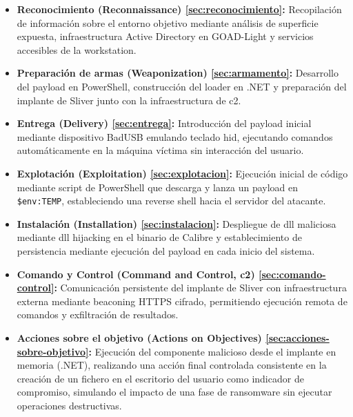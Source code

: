 \begin{itemize}
    \item \textbf{Reconocimiento (Reconnaissance) \ref{sec:reconocimiento}:} 
    Recopilación de información sobre el entorno objetivo mediante análisis de superficie expuesta, infraestructura Active Directory en GOAD-Light y servicios accesibles de la workstation.
     
    \item \textbf{Preparación de armas (Weaponization) \ref{sec:armamento}:} 
    Desarrollo del payload en PowerShell, construcción del loader en .NET y preparación del implante de Sliver junto con la infraestructura de \acrshort{c2}.
 
    \item \textbf{Entrega (Delivery) \ref{sec:entrega}:} 
    Introducción del payload inicial mediante dispositivo BadUSB emulando teclado \acrshort{hid}, ejecutando comandos automáticamente en la máquina víctima sin interacción del usuario.

    \item \textbf{Explotación (Exploitation) \ref{sec:explotacion}:} 
    Ejecución inicial de código mediante script de PowerShell que descarga y lanza un payload en \texttt{\$env:TEMP}, estableciendo una reverse shell hacia el servidor del atacante.
 
    \item \textbf{Instalación (Installation) \ref{sec:instalacion}:} 
    Despliegue de \acrshort{dll} maliciosa mediante \acrshort{dll} hijacking en el binario de Calibre y establecimiento de persistencia mediante ejecución del payload en cada inicio del sistema.

    \item \textbf{Comando y Control (Command and Control, \acrshort{c2}) \ref{sec:comando-control}:} 
    Comunicación persistente del implante de Sliver con infraestructura externa mediante beaconing HTTPS cifrado, permitiendo ejecución remota de comandos y exfiltración de resultados.

    \item \textbf{Acciones sobre el objetivo (Actions on Objectives) \ref{sec:acciones-sobre-objetivo}:} 
    Ejecución del componente malicioso desde el implante en memoria (.NET), realizando una acción final controlada consistente en la creación de un fichero en el escritorio del usuario como indicador de compromiso, simulando el impacto de una fase de ransomware sin ejecutar operaciones destructivas.
\end{itemize}

